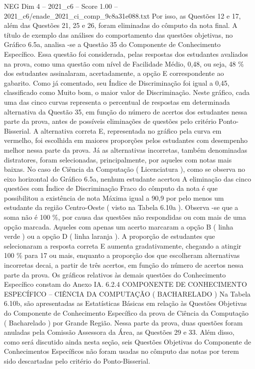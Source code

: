 \begin{textsample}{NEG Dim 4 – 2021\_c6 – Score 1.00 – 2021\_c6/enade\_2021\_ci\_comp\_9c8a31e088.txt}
Por isso, as Questões 12 e 17, além das Questões 21, 25 e 26, foram eliminadas do cômputo da nota final.
A título de exemplo das análises do comportamento das questões objetivas, no Gráfico 6.5a, analisa -se a Questão 35 do Componente de Conhecimento Específico.
Essa questão foi considerada, pelas respostas dos estudantes avaliados na prova, como uma questão com nível de Facilidade Médio, 0,48, ou seja, 48 \% dos estudantes assinalaram, acertadamente, a opção E correspondente ao gabarito.
Como já comentado, seu Índice de Discriminação foi igual a 0,45, classificado como Muito bom, o maior valor de Discriminação.
Neste gráfico, cada uma das cinco curvas representa o percentual de respostas em determinada alternativa da Questão 35, em função do número de acertos dos estudantes nessa parte da prova, antes de possíveis eliminações de questões pelo critério Ponto-Bisserial.
A alternativa correta E, representada no gráfico pela curva em vermelho, foi escolhida em maiores proporções pelos estudantes com desempenho melhor nessa parte da prova.
Já as alternativas incorretas, também denominadas distratores, foram selecionadas, principalmente, por aqueles com notas mais baixas.
No caso de Ciência da Computação ( Licenciatura ), como se observa no eixo horizontal do Gráfico 6.5a, nenhum estudante acertou A eliminação das cinco questões com Índice de Discriminação Fraco do cômputo da nota é que possibilitou a existência de nota Máxima igual a 90,9 por pelo menos um estudante da região Centro-Oeste ( visto na Tabela 6.10a ).
Observa -se que a soma não é 100 \%, por causa das questões não respondidas ou com mais de uma opção marcada.
Aqueles com apenas um acerto marcaram a opção B ( linha verde ) ou a opção D ( linha laranja ).
A proporção de estudantes que selecionaram a resposta correta E aumenta gradativamente, chegando a atingir 100 \% para 17 ou mais, enquanto a proporção dos que escolheram alternativas incorretas decai, a partir de três acertos, em função do número de acertos nessa parte da prova.
Os gráficos relativos às demais questões do Conhecimento Específico constam do Anexo IA. 6.2.4 COMPONENTE DE CONHECIMENTO ESPECÍFICO – CIÊNCIA DA COMPUTAÇÃO ( BACHARELADO ) Na Tabela 6.10b, são apresentadas as Estatísticas Básicas em relação às Questões Objetivas do Componente de Conhecimento Específico da prova de Ciência da Computação ( Bacharelado ) por Grande Região.
Nessa parte da prova, duas questões foram anuladas pela Comissão Assessora da Área, as Questões 29 e 33.
Além disso, como será discutido ainda nesta seção, seis Questões Objetivas do Componente de Conhecimentos Específicos não foram usadas no cômputo das notas por terem sido descartadas pelo critério do Ponto-Bisserial.

\end{textsample}
